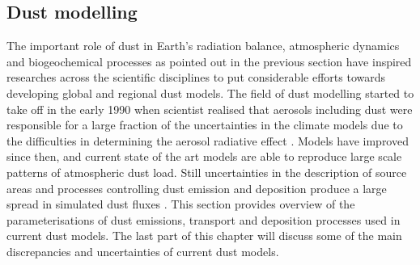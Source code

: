        
\subsection{Dust modelling}\label{sec:dust_modelling}

The important role of dust in Earth’s radiation balance, atmospheric dynamics and
biogeochemical processes as pointed out in the previous section have inspired researches across the scientific disciplines to put considerable efforts towards developing global and regional dust models.    
The field of dust modelling started to take off in the early 1990 when scientist realised that aerosols including dust were responsible for a large fraction of the uncertainties in the climate models due to the difficulties in determining the aerosol radiative effect \parencite{tegen1996influence}. Models have improved since then, and current state of the art models are able to reproduce large scale patterns of atmospheric dust load. Still uncertainties in the description of
source areas and processes controlling dust emission and deposition produce a large spread in simulated dust fluxes \parencite{huneeus2011global}. This section provides overview of the parameterisations of dust emissions, transport and deposition processes used in current dust models. The last part of this chapter will discuss some of the main discrepancies and uncertainties of current dust models.



